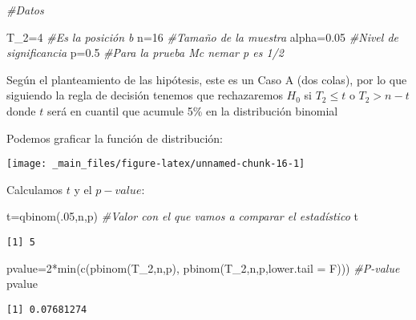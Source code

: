 \documentclass[
  a4paper,
  oneside,
  openany]{book}
\newenvironment{Shaded}{\begin{snugshade}}{\end{snugshade}}
\newcommand{\AttributeTok}[1]{\textcolor[rgb]{0.77,0.63,0.00}{#1}}
\newcommand{\CommentTok}[1]{\textcolor[rgb]{0.56,0.35,0.01}{\textit{#1}}}
\newcommand{\DecValTok}[1]{\textcolor[rgb]{0.00,0.00,0.81}{#1}}
\newcommand{\FloatTok}[1]{\textcolor[rgb]{0.00,0.00,0.81}{#1}}
\newcommand{\FunctionTok}[1]{\textcolor[rgb]{0.00,0.00,0.00}{#1}}
\newcommand{\NormalTok}[1]{#1}
\newcommand{\OtherTok}[1]{\textcolor[rgb]{0.56,0.35,0.01}{#1}}
\newcommand{\SpecialCharTok}[1]{\textcolor[rgb]{0.00,0.00,0.00}{#1}}
\begin{document}
\begin{Shaded}
\begin{Highlighting}[]
\CommentTok{\#Datos}

\NormalTok{T\_2}\OtherTok{=}\DecValTok{4}                    \CommentTok{\#Es la posición b}
\NormalTok{n}\OtherTok{=}\DecValTok{16}                     \CommentTok{\#Tamaño de la muestra}
\NormalTok{alpha}\OtherTok{=}\FloatTok{0.05}               \CommentTok{\#Nivel de significancia}
\NormalTok{p}\OtherTok{=}\FloatTok{0.5}                    \CommentTok{\#Para la prueba Mc nemar p es 1/2}
\end{Highlighting}
\end{Shaded}

Según el planteamiento de las hipótesis, este es un Caso A (dos colas), por lo que siguiendo la regla de decisión tenemos que rechazaremos \(H_0\) si \(T_2 \leq t\) o \(T_2>n-t\) donde \(t\) será en cuantil que acumule 5\% en la distribución binomial

Podemos graficar la función de distribución:

\begin{center}\texttt{[image: \_main\_files/figure-latex/unnamed-chunk-16-1]} \end{center}

Calculamos \(t\) y el \(p-value\):

\begin{Shaded}
\begin{Highlighting}[]
\NormalTok{t}\OtherTok{=}\FunctionTok{qbinom}\NormalTok{(.}\DecValTok{05}\NormalTok{,n,p)       }\CommentTok{\#Valor con el que vamos a comparar el estadístico}
\NormalTok{t}
\end{Highlighting}
\end{Shaded}

\begin{verbatim}
[1] 5
\end{verbatim}

\begin{Shaded}
\begin{Highlighting}[]
\NormalTok{pvalue}\OtherTok{=}\DecValTok{2}\SpecialCharTok{*}\FunctionTok{min}\NormalTok{(}\FunctionTok{c}\NormalTok{(}\FunctionTok{pbinom}\NormalTok{(T\_2,n,p), }\FunctionTok{pbinom}\NormalTok{(T\_2,n,p,}\AttributeTok{lower.tail =}\NormalTok{ F)))   }\CommentTok{\#P{-}value}
\NormalTok{pvalue}
\end{Highlighting}
\end{Shaded}

\begin{verbatim}
[1] 0.07681274
\end{verbatim}
\end{document}
